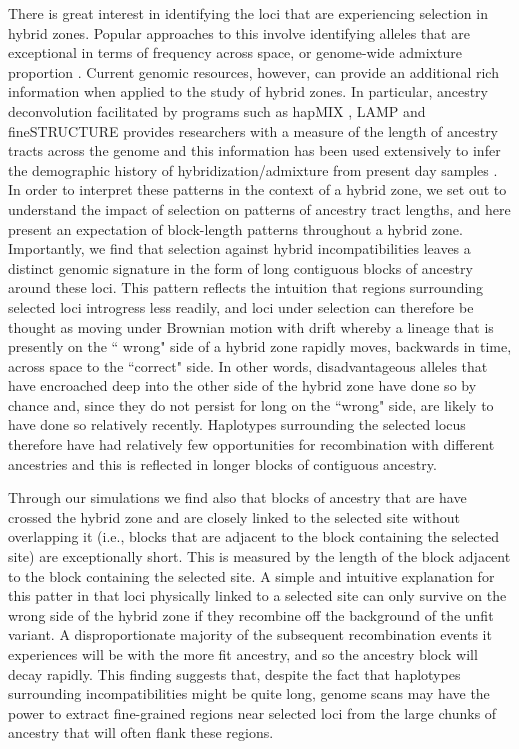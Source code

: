 \documentclass[11pt,letterpaper]{article}
\begin{document}
There is great interest in identifying the loci that are experiencing selection in hybrid zones. Popular approaches to this involve identifying alleles that are exceptional in terms of frequency across space, or genome-wide admixture proportion \citep{Porter1997,Gompert2012}.  
Current genomic resources, however, can provide an additional rich information when applied to the study of hybrid zones.
In particular, ancestry deconvolution facilitated by programs such as  hapMIX \citep{Price2009}, LAMP \citep{Sankararaman2008} and fineSTRUCTURE \citep{Lawson2012} provides researchers with a measure of the length of ancestry tracts across the genome and this information has been used extensively to infer the demographic history of hybridization/admixture from present day samples \citep[e.g. ][]{Hellenthal2014}. 
In order to interpret these patterns in the context of a hybrid zone, we set out to understand the impact of selection on patterns of ancestry tract lengths, and here present an expectation of block-length patterns throughout a hybrid zone. 
Importantly, we find that selection against hybrid incompatibilities leaves a distinct genomic signature in the form of long contiguous blocks of ancestry around these loci.
This pattern reflects the intuition that regions surrounding selected loci introgress less readily, and loci under selection can therefore be thought as moving under Brownian motion with drift whereby a lineage that is presently on the `` wrong" side of a hybrid zone rapidly moves, backwards in time, across space to the ``correct" side. 
In other words, disadvantageous alleles that have encroached deep into the other side of the hybrid zone have done so by chance and, since they do not persist for long on the ``wrong" side, are likely to have done so relatively recently. Haplotypes surrounding the selected locus therefore have had relatively few opportunities for recombination with different ancestries and this is reflected in longer blocks of contiguous ancestry.

Through our simulations we find also that blocks of ancestry that are have crossed the hybrid zone and are closely linked to the selected site without overlapping it (i.e., blocks that are adjacent to the block containing the selected site) are exceptionally short. This is measured by the length of the block adjacent to the block containing the selected site. 
A simple and intuitive explanation for this patter in that loci physically linked to a selected site can only survive on the wrong side of the hybrid zone if they recombine off the background of the unfit variant. 
A disproportionate majority of the subsequent recombination events it experiences will be with the more fit ancestry, and so the ancestry block will decay rapidly. 
This finding suggests that, despite the fact that  haplotypes surrounding incompatibilities might be quite long, genome scans may have the power to extract fine-grained regions near selected loci from the large chunks of ancestry that will often flank these regions. 
\end{document}
